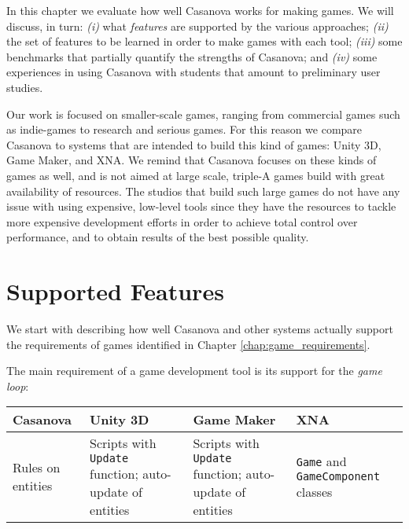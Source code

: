 In this chapter we evaluate how well Casanova works for making games. We will discuss, in turn: \textit{(i)} what \textit{features} are supported by the various approaches; \textit{(ii)} the set of features to be learned in order to make games with each tool; \textit{(iii)} some benchmarks that partially quantify the strengths of Casanova; and \textit{(iv)} some experiences in using Casanova with students that amount to preliminary user studies.

Our work is focused on smaller-scale games, ranging from commercial games such as indie-games to research and serious games. For this reason we compare Casanova to systems that are intended to build this kind of games: Unity 3D, Game Maker, and XNA. We remind that Casanova focuses on these kinds of games as well, and is not aimed at large scale, triple-A games build with great availability of resources. The studios that build such large games do not have any issue with using expensive, low-level tools since they have the resources to tackle more expensive development efforts in order to achieve total control over performance, and to obtain results of the best possible quality.

\section{Supported Features}
We start with describing how well Casanova and other systems actually support the requirements of games identified in Chapter \ref{chap:game_requirements}.

The main requirement of a game development tool is its support for the \textit{game loop}:

\begin{tabular}{ | p{2.8cm} | p{2.5cm} | p{2.8cm} | p{2.8cm} | }
\hline
Casanova & Unity 3D & Game Maker & XNA \\
\hline
Rules on entities & Scripts with \texttt{Update} function; auto-update of entities & Scripts with \texttt{Update} function; auto-update of entities & \texttt{Game} and \texttt{GameComponent} classes \\
\hline
\end{tabular}

